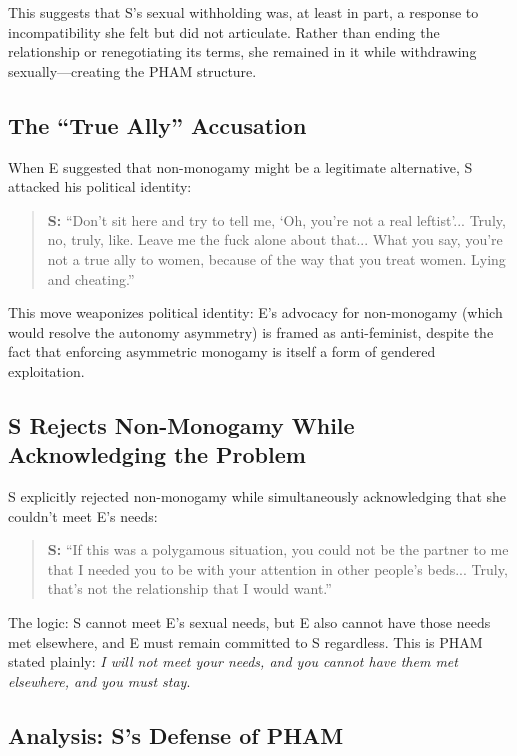 \documentclass[12pt,openany]{book}
\numberwithin{equation}{chapter}
\begin{document}
This suggests that S's sexual withholding was, at least in part, a response to incompatibility she felt but did not articulate. Rather than ending the relationship or renegotiating its terms, she remained in it while withdrawing sexually---creating the PHAM structure.

\subsection{The ``True Ally'' Accusation}

When E suggested that non-monogamy might be a legitimate alternative, S attacked his political identity:

\begin{quote}
\textbf{S:} ``Don't sit here and try to tell me, `Oh, you're not a real leftist'... Truly, no, truly, like. Leave me the fuck alone about that... What you say, you're not a true ally to women, because of the way that you treat women. Lying and cheating.''
\end{quote}

This move weaponizes political identity: E's advocacy for non-monogamy (which would resolve the autonomy asymmetry) is framed as anti-feminist, despite the fact that enforcing asymmetric monogamy is itself a form of gendered exploitation.

\subsection{S Rejects Non-Monogamy While Acknowledging the Problem}

S explicitly rejected non-monogamy while simultaneously acknowledging that she couldn't meet E's needs:

\begin{quote}
\textbf{S:} ``If this was a polygamous situation, you could not be the partner to me that I needed you to be with your attention in other people's beds... Truly, that's not the relationship that I would want.''
\end{quote}

The logic: S cannot meet E's sexual needs, but E also cannot have those needs met elsewhere, and E must remain committed to S regardless. This is PHAM stated plainly: \textit{I will not meet your needs, and you cannot have them met elsewhere, and you must stay}.

\subsection{Analysis: S's Defense of PHAM}
\end{document}
